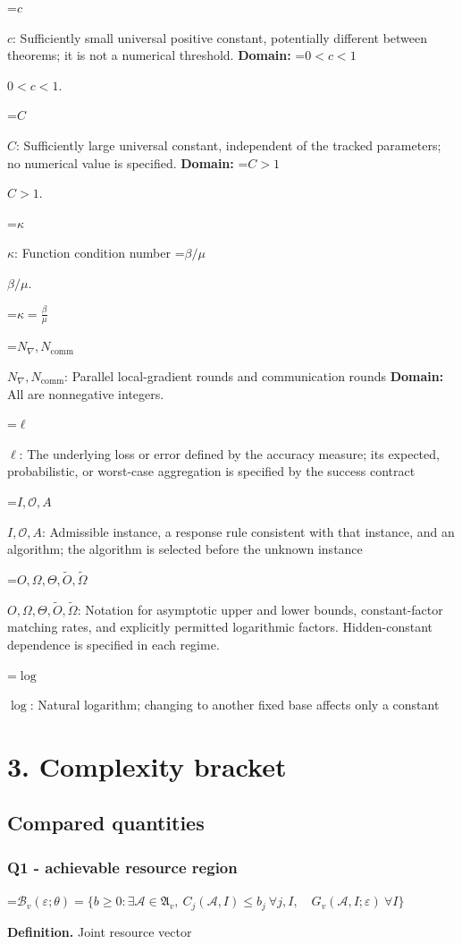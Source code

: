 \documentclass[10pt,a4paper]{article}
\newcommand{\AtlasMath}[1]{\par\begingroup\centering\setbox0=\hbox{$\displaystyle #1$}\ifdim\wd0>1.4\linewidth\typeout{ATLAS WIDE FORMULA: \the\wd0}\fi\ifdim\wd0>\linewidth\resizebox{\linewidth}{!}{\box0}\else\box0\fi\par\endgroup}
\newcommand{\AtlasInlineMath}[1]{\begingroup\setbox0=\hbox{$#1$}\ifdim\wd0>.4\linewidth\endgroup\AtlasMath{#1}\else\endgroup$#1$\fi}
\begin{document}
\AtlasInlineMath{c}: Sufficiently small universal positive constant, potentially different between theorems; it is not a numerical threshold. \textbf{Domain:} \AtlasInlineMath{0<c<1}.

\AtlasInlineMath{C}: Sufficiently large universal constant, independent of the tracked parameters; no numerical value is specified. \textbf{Domain:} \AtlasInlineMath{C>1}.

\AtlasInlineMath{\kappa}: Function condition number \AtlasInlineMath{\beta/\mu}.


\AtlasMath{\kappa=\frac{\beta}{\mu}}


\AtlasInlineMath{N_{\nabla},N_{\mathrm{comm}}}: Parallel local-gradient rounds and communication rounds \textbf{Domain:} All are nonnegative integers.

\AtlasInlineMath{\ell}: The underlying loss or error defined by the accuracy measure; its expected, probabilistic, or worst-case aggregation is specified by the success contract

\AtlasInlineMath{I,\mathcal{O},A}: Admissible instance, a response rule consistent with that instance, and an algorithm; the algorithm is selected before the unknown instance

\AtlasInlineMath{O,\Omega,\Theta,\widetilde{O},\widetilde\Omega}: Notation for asymptotic upper and lower bounds, constant-factor matching rates, and explicitly permitted logarithmic factors. Hidden-constant dependence is specified in each regime.

\AtlasInlineMath{\log}: Natural logarithm; changing to another fixed base affects only a constant

\section{3. Complexity bracket}
\subsection{Compared quantities}
\subsubsection{Q1 - achievable resource region}
\AtlasMath{\mathcal B_v(\varepsilon;\theta)=\{b\ge0:\exists\mathcal A\in\mathfrak A_v,\ C_j(\mathcal A,I)\le b_j\ \forall j,I,\quad G_v(\mathcal A,I;\varepsilon)\ \forall I\}}
\textbf{Definition.} Joint resource vector
\end{document}
